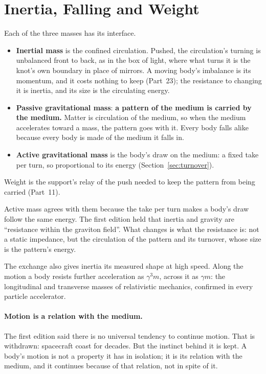 \documentclass[11pt,a4paper]{article}
\begin{document}
\section{Inertia, Falling and Weight}
\label{sec:inertia}

\begin{hypbar}
Each of the three masses has its interface.
\begin{itemize}
\item \textbf{Inertial mass} is the confined circulation. Pushed, the circulation's turning is unbalanced front to back, as in the box of light, where what turns it is the knot's own boundary in place of mirrors. A moving body's imbalance is its momentum, and it costs nothing to keep (Part~23); the resistance to changing it is inertia, and its size is the circulating energy.
\item \textbf{Passive gravitational mass}: \textbf{a pattern of the medium is carried by the medium.} Matter is circulation of the medium, so when the medium accelerates toward a mass, the pattern goes with it. Every body falls alike because every body is made of the medium it falls in.
\item \textbf{Active gravitational mass} is the body's draw on the medium: a fixed take per turn, so proportional to its energy (Section~\ref{sec:turnover}).
\end{itemize}
Weight is the support's relay of the push needed to keep the pattern from being carried (Part~11).
\end{hypbar}

 Active mass agrees with them because the take per turn makes a body's draw follow the same energy. The first edition held that inertia and gravity are ``resistance within the graviton field''. What changes is what the resistance is: not a static impedance, but the circulation of the pattern and its turnover, whose size is the pattern's energy.

The exchange also gives inertia its measured shape at high speed. Along the motion a body resists further acceleration as $\gamma^3 m$, across it as $\gamma m$: the longitudinal and transverse masses of relativistic mechanics, confirmed in every particle accelerator.

\paragraph{Motion is a relation with the medium.} The first edition said there is no universal tendency to continue motion. That is withdrawn: spacecraft coast for decades. But the instinct behind it is kept. A body's motion is not a property it has in isolation; it is its relation with the medium, and it continues because of that relation, not in spite of it.
\end{document}
